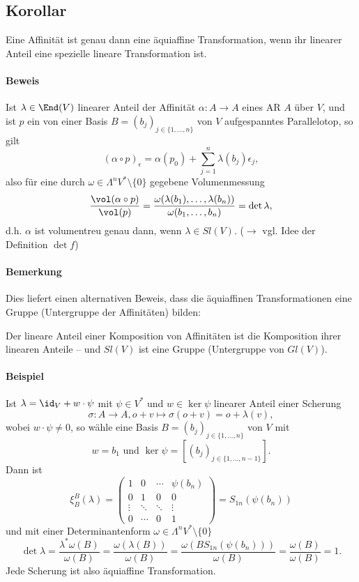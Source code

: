 \subsection{Korollar}
	Eine Affinität ist genau dann eine äquiaffine Transformation, wenn ihr linearer Anteil eine spezielle lineare Transformation ist.
\paragraph{Beweis}
	Ist $ \lambda \in \End(V) $ linearer Anteil der Affinität $ \alpha:A\to A $ eines AR $ A  $ über $ V $, und ist $ p $ ein von einer Basis $ B=(b_j)_{j\in \{1,\dots,n\}} $ von $ V $ aufgespanntes Parallelotop, so gilt
		\[ (\alpha\circ p)_\epsilon = \alpha(p_0)+\sum_{j=1}^{n}\lambda(b_j)\epsilon_j, \]
	also für eine durch $ \omega\in \Lambda^nV^*\setminus \{0\} $ gegebene Volumenmessung
		\[ \frac{\vol(\alpha\circ p)}{\vol(p)} = \frac{\omega(\lambda(b_1),\dots,\lambda(b_n))}{\omega(b_1,\dots,b_n)}=\det \lambda, \]
	d.h. $ \alpha $ ist volumentreu genau dann, wenn $ \lambda \in Sl(V) $. ($ \rightarrow $ vgl. Idee der Definition $ \det f $)
\paragraph{Bemerkung}
	Dies liefert einen alternativen Beweis, dass die äquiaffinen Transformationen eine Gruppe (Untergruppe der Affinitäten) bilden:
	
	Der lineare Anteil einer Komposition von Affinitäten ist die Komposition ihrer linearen Anteile -- und $ Sl(V) $ ist eine Gruppe (Untergruppe von $ Gl(V) $).
\paragraph{Beispiel}
	Ist $ \lambda = \id_V + w\cdot \psi $ mit $ \psi\in V^* $ und $ w\in \ker \psi $ linearer Anteil einer Scherung
		\[ \sigma:A\to A, o+v\mapsto \sigma(o+v) = o+\lambda(v), \]
	wobei $ w\cdot\psi\neq 0 $, so wähle eine Basis $ B = (b_j)_{j\in\{1,\dots,n\}}$ von $ V $ mit
		\[ w=b_1 \text{ und }  \ker \psi = [(b_j)_{j\in \{1,\dots,n-1\}}]. \]
	Dann ist
		\[ \xi_B^B(\lambda) =
			\begin{pmatrix}
				1 & 0 & \cdots & \psi(b_n)\\
				0 & 1 & 0 & 0 \\
				\vdots &\ddots & \ddots & \vdots\\
				0 &\cdots& 0 & 1
			\end{pmatrix} = S_{1n}(\psi(b_n)) \]
	und mit einer Determinantenform $ \omega\in \Lambda^nV^*\setminus\{0\} $
		\[ \det \lambda = \frac{\lambda^*\omega(B)}{\omega(B)} = \frac{\omega(\lambda(B))}{\omega(B)} = \frac{\omega(BS_{1n}(\psi(b_n)))}{\omega(B)} = \frac{\omega(B)}{\omega(B)} = 1.\]
	Jede Scherung ist also äquiaffine Transformation.
    
